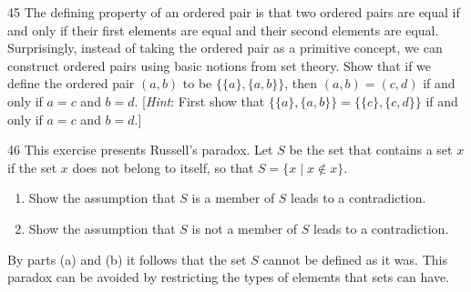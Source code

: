 \documentclass[11pt]{article}
\begin{document}
\begin{exercise}{45}
    The defining property of an ordered pair is that two ordered pairs
    are equal if and only if their first elements are equal and their
    second elements are equal. Surprisingly, instead of taking the
    ordered pair as a primitive concept, we can construct ordered pairs
    using basic notions from set theory. Show that if we define the
    ordered pair $(a,b)$ to be $\{\{a\},\{a,b\}\}$, then $(a,b) = (c,d)$
    if and only if $a = c$ and $b = d$.
    [\emph{Hint}: First show that $\{\{a\},\{a,b\}\} = \{\{c\},\{c,d\}\}$
    if and only if $a = c$ and $b = d$.]
\end{exercise}

\begin{exercise}{46}
    This exercise presents Russell's paradox. Let $S$ be the set that
    contains a set $x$ if the set $x$ does not belong to itself, so that
    $S = \{x \mid x \notin x\}$.
    \begin{enumerate}[label=(\alph*)]
        \item Show the assumption that $S$ is a member of $S$ leads to a
        contradiction.
        \item Show the assumption that $S$ is not a member of $S$ leads
        to a contradiction.
    \end{enumerate}
    By parts (a) and (b) it follows that the set $S$ cannot be defined as
    it was. This paradox can be avoided by restricting the types of
    elements that sets can have.
\end{exercise}
\end{document}
